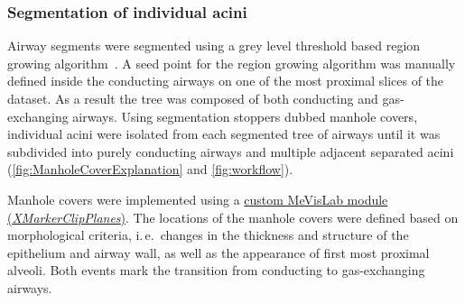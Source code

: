 \documentclass[a4paper,DIV=calc,abstract,english]{scrartcl}
\newcommand{\ie}{i.\,e.\ }
\begin{document}
\subsubsection{Segmentation of individual acini}
\label{sec:manhole covers}
Airway segments were segmented using a grey level threshold based region growing algorithm~\cite{Zucker1976}.
A seed point for the region growing algorithm was manually defined inside the conducting airways on one of the most proximal slices of the dataset.
As a result the tree was composed of both conducting and gas-exchanging airways.
Using segmentation stoppers dubbed manhole covers, individual acini were isolated from each segmented tree of airways until it was subdivided into purely conducting airways and multiple adjacent separated acini (\autoref{fig:ManholeCoverExplanation} and \ref{fig:workflow}).

Manhole covers were implemented using a \href{http://www.mevis-research.de/cgi-bin/discus/board-auth.cgi?lm=1282233250&file=/839/11760.html}{custom MeVisLab module (\emph{XMarkerClipPlanes})}.
The locations of the manhole covers were defined based on morphological criteria, \ie changes in the thickness and structure of the epithelium and airway wall, as well as the appearance of first most proximal alveoli.
Both events mark the transition from conducting to gas-exchanging airways.
\end{document}
